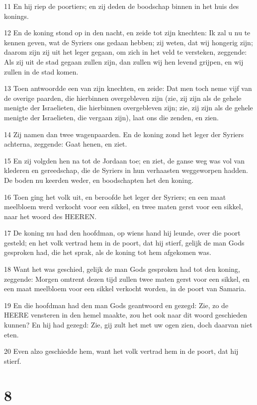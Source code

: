\par 11 En hij riep de poortiers; en zij deden de boodschap binnen in het huis des konings.
\par 12 En de koning stond op in den nacht, en zeide tot zijn knechten: Ik zal u nu te kennen geven, wat de Syriers ons gedaan hebben; zij weten, dat wij hongerig zijn; daarom zijn zij uit het leger gegaan, om zich in het veld te versteken, zeggende: Als zij uit de stad gegaan zullen zijn, dan zullen wij hen levend grijpen, en wij zullen in de stad komen.
\par 13 Toen antwoordde een van zijn knechten, en zeide: Dat men toch neme vijf van de overige paarden, die hierbinnen overgebleven zijn (zie, zij zijn als de gehele menigte der Israelieten, die hierbinnen overgebleven zijn; zie, zij zijn als de gehele menigte der Israelieten, die vergaan zijn), laat ons die zenden, en zien.
\par 14 Zij namen dan twee wagenpaarden. En de koning zond het leger der Syriers achterna, zeggende: Gaat henen, en ziet.
\par 15 En zij volgden hen na tot de Jordaan toe; en ziet, de ganse weg was vol van klederen en gereedschap, die de Syriers in hun verhaasten weggeworpen hadden. De boden nu keerden weder, en boodschapten het den koning.
\par 16 Toen ging het volk uit, en beroofde het leger der Syriers; en een maat meelbloem werd verkocht voor een sikkel, en twee maten gerst voor een sikkel, naar het woord des HEEREN.
\par 17 De koning nu had den hoofdman, op wiens hand hij leunde, over die poort gesteld; en het volk vertrad hem in de poort, dat hij stierf, gelijk de man Gods gesproken had, die het sprak, als de koning tot hem afgekomen was.
\par 18 Want het was geschied, gelijk de man Gods gesproken had tot den koning, zeggende: Morgen omtrent dezen tijd zullen twee maten gerst voor een sikkel, en een maat meelbloem voor een sikkel verkocht worden, in de poort van Samaria.
\par 19 En die hoofdman had den man Gods geantwoord en gezegd: Zie, zo de HEERE vensteren in den hemel maakte, zou het ook naar dit woord geschieden kunnen? En hij had gezegd: Zie, gij zult het met uw ogen zien, doch daarvan niet eten.
\par 20 Even alzo geschiedde hem, want het volk vertrad hem in de poort, dat hij stierf.

\chapter{8}

